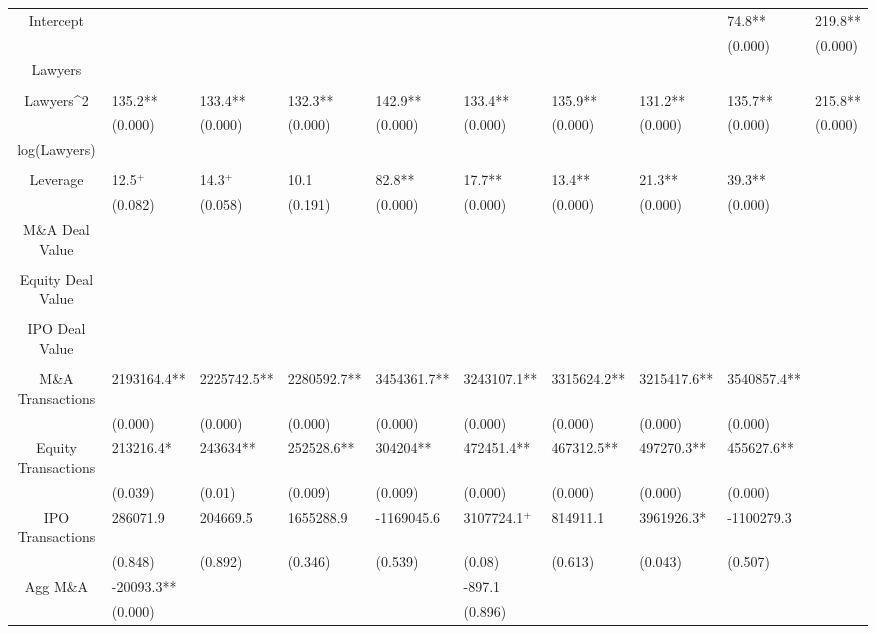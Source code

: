 \documentclass{article}
\begin{document}
\begin{table}[H]
\begin{tabular}{|clllllllll|}
Intercept &  &  &  &  &  &  &  & 74.8** & 219.8** \\ 
   &  &  &  &  &  &  &  & (0.000) & (0.000) \\ 
  Lawyers &  &  &  &  &  &  &  &  &  \\ 
   &  &  &  &  &  &  &  &  &  \\ 
  Lawyers^2 & 135.2** & 133.4** & 132.3** & 142.9** & 133.4** & 135.9** & 131.2** & 135.7** & 215.8** \\ 
   & (0.000) & (0.000) & (0.000) & (0.000) & (0.000) & (0.000) & (0.000) & (0.000) & (0.000) \\ 
  log(Lawyers) &  &  &  &  &  &  &  &  &  \\ 
   &  &  &  &  &  &  &  &  &  \\ 
  Leverage & 12.5$^{+}$ & 14.3$^{+}$ & 10.1 & 82.8** & 17.7** & 13.4** & 21.3** & 39.3** &  \\ 
   & (0.082) & (0.058) & (0.191) & (0.000) & (0.000) & (0.000) & (0.000) & (0.000) &  \\ 
  M\&A Deal Value &  &  &  &  &  &  &  &  &  \\ 
   &  &  &  &  &  &  &  &  &  \\ 
  Equity Deal Value &  &  &  &  &  &  &  &  &  \\ 
   &  &  &  &  &  &  &  &  &  \\ 
  IPO Deal Value &  &  &  &  &  &  &  &  &  \\ 
   &  &  &  &  &  &  &  &  &  \\ 
  M\&A Transactions & 2193164.4** & 2225742.5** & 2280592.7** & 3454361.7** & 3243107.1** & 3315624.2** & 3215417.6** & 3540857.4** &  \\ 
   & (0.000) & (0.000) & (0.000) & (0.000) & (0.000) & (0.000) & (0.000) & (0.000) &  \\ 
  Equity Transactions & 213216.4* & 243634** & 252528.6** & 304204** & 472451.4** & 467312.5** & 497270.3** & 455627.6** &  \\ 
   & (0.039) & (0.01) & (0.009) & (0.009) & (0.000) & (0.000) & (0.000) & (0.000) &  \\ 
  IPO Transactions & 286071.9 & 204669.5 & 1655288.9 & -1169045.6 & 3107724.1$^{+}$ & 814911.1 & 3961926.3* & -1100279.3 &  \\ 
   & (0.848) & (0.892) & (0.346) & (0.539) & (0.08) & (0.613) & (0.043) & (0.507) &  \\ 
  Agg M\&A & -20093.3** &  &  &  & -897.1 &  &  &  &  \\ 
   & (0.000) &  &  &  & (0.896) &  &  &  &  \\ 

\end{tabular}
\end{table}
\end{document}
